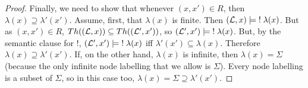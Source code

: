 \begin{proof}
Finally, we need to show that whenever $(x,x') \in R$, then $\lambda(x) \supseteq \lambda'(x')$.
Assume, first, that $\lambda(x)$ is finite. 
Then $(\mathcal{L}, x) \models \; ! \; \lambda(x)$.
But as $(x,x') \in R$, $Th((\mathcal{L}, x)) \subseteq Th((\mathcal{L}', x')) $, so  $(\mathcal{L}', x') \models \; ! \; \lambda(x)$.
But, by the semantic clause for $!$, $(\mathcal{L}', x') \models \; ! \; \lambda(x)$ iff $\lambda'(x') \subseteq \lambda(x)$.
Therefore $\lambda(x) \supseteq \lambda'(x')$.
If, on the other hand, $\lambda(x)$ is infinite, then $\lambda(x) = \Sigma$ (because the only infinite node labelling that we allow is $\Sigma$). Every node labelling is a subset of $\Sigma$, so in this case too, $\lambda(x) = \Sigma \supseteq \lambda'(x')$.
\end{proof}
